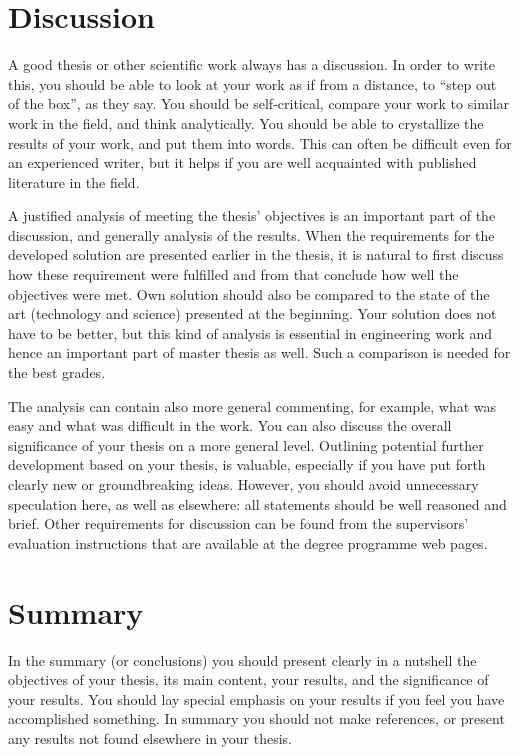 \section{Discussion}

A good thesis or other scientific work always has a discussion. In order to write this, you should be able to look at your work as if from a distance, to \DIFdelbegin {}\DIFdelend \DIFaddbegin \enquote{step out of the box}\DIFaddend , as they say. You should be self-critical, compare your work to similar work in the field, and think analytically. You should be able to crystallize the results of your work, and put them into words. This can often be difficult even for an experienced writer, but it helps if you are well acquainted with published literature in the field.

A justified analysis of meeting the thesis’ objectives is an important part of the discussion, and generally analysis of the results. When the requirements for the developed solution are presented earlier in the thesis, it is natural to first discuss how these requirement were fulfilled and from that conclude how well the objectives were met. Own solution should also be compared to the state of the art (technology and science) presented at the beginning. Your solution does not have to be better, but this kind of analysis is essential in engineering work and hence an important part of master thesis as well. Such a comparison is needed for the best grades.

The analysis can contain also more general commenting, for example, what was easy and what was difficult in the work. You can also discuss the overall significance of your thesis on a more general level. Outlining potential further development based on your thesis, is valuable, especially if you have put forth clearly new or groundbreaking ideas. However, you should avoid unnecessary speculation here, as well as elsewhere: all statements should be well reasoned and brief. Other requirements for discussion can be found from the supervisors’ evaluation instructions that are available at the degree programme web pages\DIFaddbegin \DIFadd{~}\DIFaddend \cite{mscstudies}.

\section{Summary}

In the summary (or conclusions) you should present clearly in a nutshell the objectives of your thesis, its main content, your results, and the significance of your results. You should lay special emphasis on your results if you feel you have accomplished something. In summary you should not make references, or present any results not found elsewhere in your thesis.

